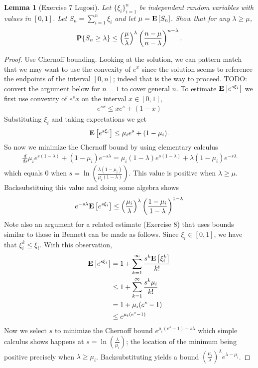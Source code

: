 \documentclass{amsart}
\newtheorem{lem}[thm]{Lemma}
\theoremstyle{remark}
\theoremstyle{definition}
\begin{document}
\begin{lem}[Exercise 7 Lugosi] Let $\{\xi_i\}_{i=1}^n$ be independent
  random variables with values in $[0,1]$.  Let $S_n = \sum_{i=1}^n
  \xi_i$ and let $\mu=\textbf{E}\left[S_n\right]$.  Show that for any
  $\lambda\geq \mu$,
\begin{align*}
\textbf{P}\{S_n \geq \lambda\} \leq
\left(\frac{\mu}{\lambda}\right)^\lambda \left(\frac{n-\mu}{n-\lambda}\right)^{n-\lambda}.
\end{align*}
\end{lem}
\begin{proof}
Use Chernoff bounding.  Looking at the solution, we can pattern match
that we may want to use the convexity of $e^x$ since the solution
seems to reference the endpoints of the interval $[0,n]$; indeed that
is the way to proceed.  TODO: convert the argument below for $n=1$ to
cover general $n$.
To estimate $\textbf{E}\left[e^{s\xi_i}\right]$ we first use convexity of
$e^sx$ on the interval $x\in[0,1]$,
\begin{align*}
e^{sx} \leq xe^s + (1-x)
\end{align*}
Substituting $\xi_i$ and taking expectations we get
\begin{align*}
\textbf{E}\left[e^{s\xi_i}\right] \leq \mu_i e^s + (1-\mu_i).
\end{align*}
So now we minimize the Chernoff bound by using elementary calculus
\begin{align*}
\frac{d}{ds} \mu_i e^{s(1-\lambda)} + (1-\mu_i)e^{-s\lambda} = \mu_i
(1-\lambda) e^{s(1-\lambda)} + \lambda (1-\mu_i)e^{-s\lambda} 
\end{align*}
which equals $0$ when
$s=\ln\left(\frac{\lambda(1-\mu_i)}{\mu_i(1-\lambda)}\right)$.  This
value is positive when $\lambda \geq \mu$.
Backsubstituing this value and doing some algebra shows
\begin{align*}
e^{-s\lambda}\textbf{E}\left[e^{s\xi_i}\right] \leq
\left(\frac{\mu_i}{\lambda}\right)^\lambda
\left(\frac{1-\mu_i}{1-\lambda}\right)^{1-\lambda}
\end{align*}
Note also an argument for a related estimate (Exercise 8) that uses bounds similar to those in Bennett can be made
as follows.  Since $\xi_i \in [0,1]$, we have that $\xi_i^k \leq
\xi_i$.  With this observation, 
\begin{align*}
\textbf{E}\left[e^{s\xi_i}\right] &= 1 + \sum_{k=1}^\infty \frac{s^k
  \textbf{E}\left[\xi_i^k\right]}{k!} \\
& \leq 1 + \sum_{k=1}^\infty \frac{s^k \mu_i}{k!} \\
&= 1 + \mu_i (e^s -1) \\
&\leq e^{\mu_i(e^s - 1)}
\end{align*}
Now we select $s$ to minimize the Chernoff bound $e^{\mu_i(e^s - 1)
  -s\lambda}$ which simple calculus shows happens at
$s=\ln\left(\frac{\lambda}{\mu_i}\right)$; the location of the minimum
being positive precisely when $\lambda \geq \mu_i$.  Backsubstituting
yields a bound $\left(\frac{\mu_i}{\lambda}\right)^\lambda e^{\lambda
  - \mu_i}$.
\end{proof}
\end{document}

